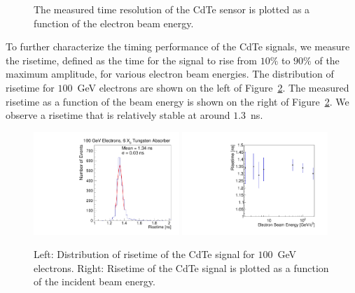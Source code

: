 \begin{figure}[htbp] 
\centering
\caption{ The measured time resolution of the CdTe sensor is plotted as a function
of the electron beam energy. } 
\label{fig:ChargeVsEnergy} 
\end{figure} 



To further characterize the timing performance of the CdTe signals, we measure the
risetime, defined as the time for the signal to rise from $10\%$ to $90\%$ of the maximum
amplitude, for various electron beam energies. The distribution of risetime for
$100$~GeV electrons are shown on the left of Figure~\ref{fig:riseTime}. The 
measured risetime as a function of the beam energy is shown on the right of 
Figure~\ref{fig:riseTime}. We observe a risetime that is relatively stable
at around $1.3$~ns.


\begin{figure}[htbp] 
\centering
\includegraphics[width=0.49\textwidth]{figures/100GeV_risetime.pdf} 
\includegraphics[width=0.49\textwidth]{figures/RisetimeVsEnergy.pdf} 
\caption{ Left: Distribution of risetime of the CdTe signal for $100$~GeV electrons. 
Right: Risetime of the CdTe signal is plotted as a function of the incident beam energy. } 
\label{fig:riseTime} 
\end{figure} 



